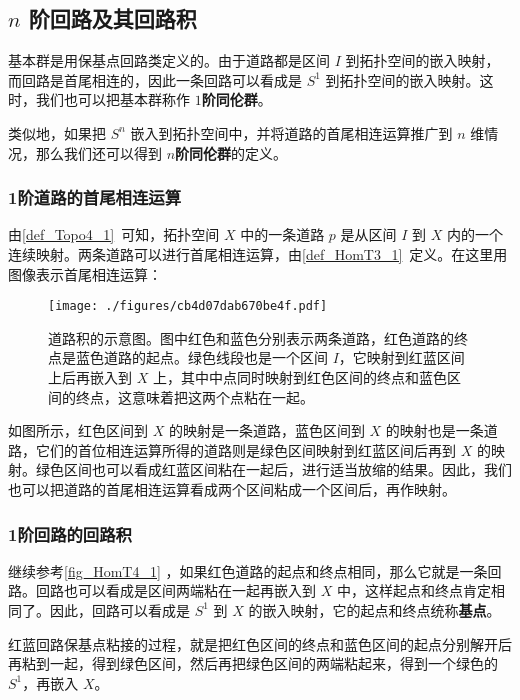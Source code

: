 \subsection{$n$ 阶回路及其回路积}

基本群是用保基点回路类定义的。由于道路都是区间 $I$ 到拓扑空间的嵌入映射，而回路是首尾相连的，因此一条回路可以看成是 $S^1$ 到拓扑空间的嵌入映射。这时，我们也可以把基本群称作 $1$\textbf{阶同伦群}。

类似地，如果把 $S^n$ 嵌入到拓扑空间中，并将道路的首尾相连运算推广到 $n$ 维情况，那么我们还可以得到 $n$\textbf{阶同伦群}的定义。

\subsubsection{1阶道路的首尾相连运算}

由\autoref{def_Topo4_1}~可知，拓扑空间 $X$ 中的一条道路 $p$ 是从区间 $I$ 到 $X$ 内的一个连续映射。两条道路可以进行首尾相连运算，由\autoref{def_HomT3_1}~定义。在这里用图像表示首尾相连运算：


\begin{figure}[ht]
\centering
\texttt{[image: ./figures/cb4d07dab670be4f.pdf]}
\caption{道路积的示意图。图中红色和蓝色分别表示两条道路，红色道路的终点是蓝色道路的起点。绿色线段也是一个区间 $I$，它映射到红蓝区间上后再嵌入到 $X$ 上，其中中点同时映射到红色区间的终点和蓝色区间的终点，这意味着把这两个点粘在一起。} \label{fig_HomT4_1}
\end{figure}

如图所示，红色区间到 $X$ 的映射是一条道路，蓝色区间到 $X$ 的映射也是一条道路，它们的首位相连运算所得的道路则是绿色区间映射到红蓝区间后再到 $X$ 的映射。绿色区间也可以看成红蓝区间粘在一起后，进行适当放缩的结果。因此，我们也可以把道路的首尾相连运算看成两个区间粘成一个区间后，再作映射。

\subsubsection{1阶回路的回路积}

继续参考\autoref{fig_HomT4_1} ，如果红色道路的起点和终点相同，那么它就是一条回路。回路也可以看成是区间两端粘在一起再嵌入到 $X$ 中，这样起点和终点肯定相同了。因此，回路可以看成是 $S^1$ 到 $X$ 的嵌入映射，它的起点和终点统称\textbf{基点}。

红蓝回路保基点粘接的过程，就是把红色区间的终点和蓝色区间的起点分别解开后再粘到一起，得到绿色区间，然后再把绿色区间的两端粘起来，得到一个绿色的 $S^1$，再嵌入 $X$。

